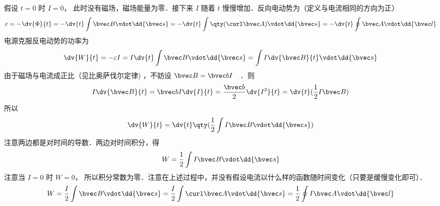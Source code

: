 假设 $t = 0$ 时 $I = 0$， 此时没有磁场，磁场能量为零．接下来 $I$ 随着 $t$ 慢慢增加．反向电动势为（定义与电流相同的方向为正）
\begin{equation}\label{BEng_eq2}
\varepsilon  =  - \dv{\Phi}{t} =  - \dv{t} \int \bvec B \vdot \dd{\bvec s} 
=  - \dv{t} \int \qty(\curl \bvec A) \vdot \dd{\bvec s} 
=  - \dv{t} \oint \bvec A \vdot \dd{\bvec l}
\end{equation}
电源克服反电动势的功率为
\begin{equation}\label{BEng_eq3}
\dv{W}{t} =  - \varepsilon I = I\dv{t} \int \bvec B \vdot \dd{\bvec s} = \int I \dv{\bvec B}{t} \vdot \dd{\bvec s}
\end{equation}
由于磁场与电流成正比（见比奥萨伐尔定律)
，不妨设 $\bvec B = \bvec bI$　．则
\begin{equation}\label{BEng_eq4}
I \dv{\bvec B}{t} = \bvec bI \dv{I}{t} = \frac{\bvec b}{2} \dv{I^2}{t} = \dv{t} (\frac12 I\bvec B)
\end{equation}
所以
\begin{equation}\label{BEng_eq5}
\dv{W}{t} = \dv{t} \qty(\frac12 \int I\bvec B \vdot \dd{\bvec s})
\end{equation}
注意两边都是对时间的导数．两边对时间积分，得
\begin{equation}\label{BEng_eq6}
W = \frac12 \int I\bvec B \vdot \dd{\bvec s}
\end{equation}
注意当 $I = 0$ 时 $ W = 0$， 所以积分常数为零．注意在上述过程中，并没有假设电流以什么样的函数随时间变化（只要是缓慢变化即可）．
\begin{equation}\label{BEng_eq7}
W = \frac{I}{2} \int \bvec B \vdot \dd{\bvec s}  = \frac{I}{2} \int \curl \bvec A \vdot \dd{\bvec s}  = \frac12 \oint I\bvec A \vdot \dd{\bvec l}
\end{equation}
 